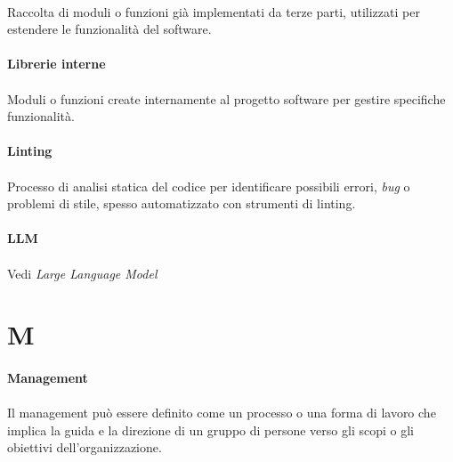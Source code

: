 \documentclass[10pt, a4paper]{article}
\begin{document}
\paragraph{}Raccolta di moduli o funzioni già implementati da terze parti, utilizzati per estendere le funzionalità del software.

\vspace{2em}
\paragraph{Librerie interne}\noindent\hrulefill
\paragraph{}Moduli o funzioni create internamente al progetto software per gestire specifiche funzionalità.

\vspace{2em}
\paragraph{Linting}\noindent\hrulefill
\paragraph{}Processo di analisi statica del codice per identificare possibili errori, \textit{bug\pg} o problemi di stile, spesso automatizzato con strumenti di linting.


\vspace{2em}
\paragraph{LLM}\noindent\hrulefill
\paragraph{}Vedi \textit{Large Language Model\pg}





\newpage
\section{M}

\vspace{2em}
\paragraph{Management}\noindent\hrulefill
\paragraph{}Il management può essere definito come un processo o una forma di lavoro che implica la guida e la direzione di un gruppo di persone verso gli scopi o gli obiettivi dell’organizzazione.
\end{document}
